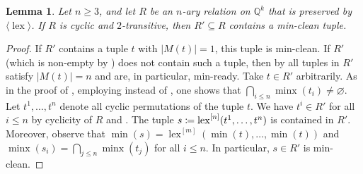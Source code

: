 \documentclass[a4paper,reqno, cleveref]{amsart}
\newcommand{\coloneqq}{\mathrel{\mathop:}\mathrel{\mkern-1.2mu}=}
\newtheorem{lemma}[theorem]{Lemma}
\newcommand{\Q}{\mathbb{Q}}
\newcommand{\ignore}[1]{}
\DeclareMathOperator{\lex}{lex}
\DeclareMathOperator{\minx}{minx}
\newcommand{\nested}[2]{{#1^{[#2]}}}
\newcommand{\gen}[1]{\langle#1\rangle}
\begin{document}
\begin{lemma}\label{l:hyplexminclean}
   Let $n \geq 3$, and let $R$ be an $n$-ary relation on $\Q^k$ that is preserved by $\gen\lex$. If $R$ is cyclic and $2$-transitive,  then $R'\subseteq R$ contains a min-clean tuple.
\end{lemma}
\begin{proof}
    If $R'$ %
    contains a tuple $t$ with $|M(t)|=1$, this tuple is min-clean.
    If $R'$ (which is non-empty by ) does not contain such a tuple, then by  all tuples in $R'$ satisfy $|M(t)|= n$ and are, in particular, min-ready. 
    Take $t\in R'$ arbitrarily. 
    As in the proof of  , employing  instead of ,  one shows that   $\bigcap_{i \leq n}\minx(t_i)\neq \varnothing.$  
    Let $t^1, \dots, t^{n}$ denote all cyclic permutations of the tuple $t$. We have $t^i \in R'$ for all $i \leq n$ by cyclicity of $R$ and .  The tuple   $s\coloneqq\nested{\lex}{n}(t^1, \dots, t^n)$ is contained in $R'$. Moreover, observe that $\min(s)=\nested{\lex}{m}(\min(t), \dots, \min(t))$ and $\minx(s_i)=\bigcap_{j\leq n}\minx(t_j)$ for all $i\leq n$. In particular, $s\in R'$ is  min-clean. 
\end{proof}

\ignore{
\section{Missing proofs from Section \texorpdfstring{\ref{sect:chasingorbits}}{Section 5}}}

\ignore{\subsection{Templates with \texorpdfstring{$pp$}{pp}}\label{sect:pptemplates}

\pphypslice*
\begin{proof}
Without loss of generality assume that $1 \in M(u^1)$, and set $q\coloneqq\min(u^1_1)$. By min-cleanliness of $u^1$, its cyclic permutations  $u^2\coloneqq(u^1_n, u^1_1, u^1_2, \dots), \dots, u^{n}\coloneqq(u^1_2, \dots, u^1_1)$ and $I\coloneqq\minx(u^1_1)$ now have the required properties. 
\end{proof}}
\end{document}
